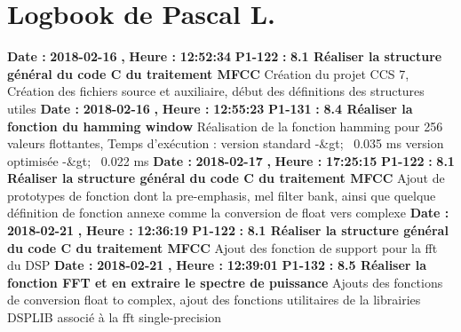 \documentclass{article}%
\begin{document}
%
\section{Logbook de Pascal L.}%
\textbf{Date : }%
\textbf{2018{-}02{-}16}%
\textbf{,}%
\textbf{ Heure : }%
\textbf{12:52:34}%
\newline%
%
\textbf{P1{-}122 }%
\textbf{ : }%
\textbf{ 8.1 Réaliser la structure général du code C du traitement MFCC}%
\newline%
\newline%
%
Création du projet CCS 7,\newline%
Création des fichiers source et auxiliaire, début des définitions des structures utiles\newline%
\newline%
%
\textbf{Date : }%
\textbf{2018{-}02{-}16}%
\textbf{,}%
\textbf{ Heure : }%
\textbf{12:55:23}%
\newline%
%
\textbf{P1{-}131 }%
\textbf{ : }%
\textbf{ 8.4 Réaliser la fonction du hamming window}%
\newline%
\newline%
%
Réalisation de la fonction hamming pour 256 valeurs flottantes,\newline%
Temps d'exécution :\newline%
version standard {-}\&gt;~ 0.035 ms\newline%
version optimisée {-}\&gt;~ 0.022 ms\newline%
\newline%
%
\textbf{Date : }%
\textbf{2018{-}02{-}17}%
\textbf{,}%
\textbf{ Heure : }%
\textbf{17:25:15}%
\newline%
%
\textbf{P1{-}122 }%
\textbf{ : }%
\textbf{ 8.1 Réaliser la structure général du code C du traitement MFCC}%
\newline%
\newline%
%
Ajout de prototypes de fonction dont la pre{-}emphasis, mel filter bank, ainsi que quelque définition de fonction annexe comme la conversion de float vers complexe\newline%
\newline%
%
\textbf{Date : }%
\textbf{2018{-}02{-}21}%
\textbf{,}%
\textbf{ Heure : }%
\textbf{12:36:19}%
\newline%
%
\textbf{P1{-}122 }%
\textbf{ : }%
\textbf{ 8.1 Réaliser la structure général du code C du traitement MFCC}%
\newline%
\newline%
%
Ajout des fonction de support pour la fft du DSP\newline%
\newline%
%
\textbf{Date : }%
\textbf{2018{-}02{-}21}%
\textbf{,}%
\textbf{ Heure : }%
\textbf{12:39:01}%
\newline%
%
\textbf{P1{-}132 }%
\textbf{ : }%
\textbf{ 8.5 Réaliser la fonction FFT et en extraire le spectre de puissance}%
\newline%
\newline%
%
Ajouts des fonctions de conversion float to complex,\newline%
ajout des fonctions utilitaires de la librairies DSPLIB associé à la fft single{-}precision\newline%
\newline%
%
\newpage
\end{document}
